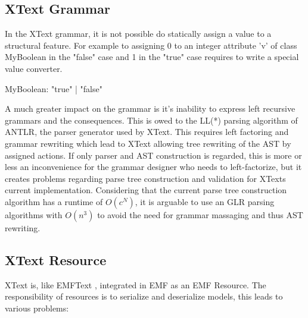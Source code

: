 \subsection{XText Grammar}
In the XText grammar, it is not possible do statically assign a value  to a structural feature. For example to assigning 0 to an integer attribute 'v' of class MyBoolean in the "false" case and 1 in the "true" case requires to write a special value converter. 
\begin{xtxt}
MyBoolean:  "true" | "false"
\end{xtxt}

A much greater impact on the grammar is it's inability to express left recursive grammars and the consequences. This is owed to the LL(*) parsing algorithm of ANTLR, the parser generator used by XText. This requires left factoring and grammar rewriting which lead to XText allowing tree rewriting of the AST by assigned actions. If only parser and AST construction is regarded, this is more or less an inconvenience for the grammar designer who needs to left-factorize, but it creates problems regarding parse tree construction and validation for XTexts current implementation. Considering that the current parse tree construction algorithm has a runtime of $O(c^N)$, it is arguable to use an GLR parsing algorithms with  $O(n^3)$ to avoid the need for grammar massaging and thus AST rewriting.

\subsection{XText Resource}
XText is, like EMFText \cite{EMFTextMan}, integrated in EMF as an EMF Resource. The responsibility of resources is to serialize and deserialize models, this leads to various problems: 

